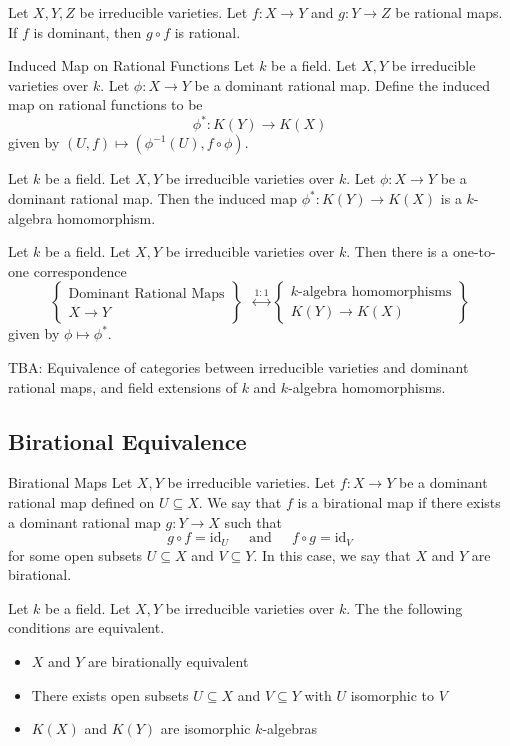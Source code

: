 \documentclass[a4paper]{article}
\begin{document}
\begin{prp}{}{} Let $X,Y,Z$ be irreducible varieties. Let $f:X\to Y$ and $g:Y\to Z$ be rational maps. If $f$ is dominant, then $g\circ f$ is rational. 
\end{prp}

\begin{defn}{Induced Map on Rational Functions}{} Let $k$ be a field. Let $X,Y$ be irreducible varieties over $k$. Let $\phi:X\to Y$ be a dominant rational map. Define the induced map on rational functions to be $$\phi^\ast:K(Y)\to K(X)$$ given by $(U,f)\mapsto (\phi^{-1}(U),f\circ\phi)$. 
\end{defn}

\begin{prp}{}{} Let $k$ be a field. Let $X,Y$ be irreducible varieties over $k$. Let $\phi:X\to Y$ be a dominant rational map. Then the induced map $\phi^\ast:K(Y)\to K(X)$ is a $k$-algebra homomorphism. 
\end{prp}

\begin{prp}{}{} Let $k$ be a field. Let $X,Y$ be irreducible varieties over $k$. Then there is a one-to-one correspondence $$\left\{\substack{\text{Dominant Rational Maps}\\X\to Y}\right\}\;\;\overset{1:1}{\longleftrightarrow}\left\{\substack{k\text{-algebra homomorphisms}\\K(Y)\to K(X)}\right\}$$ given by $\phi\mapsto\phi^\ast$. 
\end{prp}

TBA: Equivalence of categories between irreducible varieties and dominant rational maps, and field extensions of $k$ and $k$-algebra homomorphisms. 

\subsection{Birational Equivalence}
\begin{defn}{Birational Maps}{} Let $X,Y$ be irreducible varieties. Let $f:X\to Y$ be a dominant rational map defined on $U\subseteq X$. We say that $f$ is a birational map if there exists a dominant rational map $g:Y\to X$ such that $$g\circ f=\text{id}_U\;\;\;\;\text{ and }\;\;\;\;f\circ g=\text{id}_V$$ for some open subsets $U\subseteq X$ and $V\subseteq Y$. In this case, we say that $X$ and $Y$ are birational. 
\end{defn}

\begin{prp}{}{} Let $k$ be a field. Let $X,Y$ be irreducible varieties over $k$. The the following conditions are equivalent. 
\begin{itemize}
\item $X$ and $Y$ are birationally equivalent
\item There exists open subsets $U\subseteq X$ and $V\subseteq Y$ with $U$ isomorphic to $V$
\item $K(X)$ and $K(Y)$ are isomorphic $k$-algebras
\end{itemize}
\end{prp}
\end{document}
